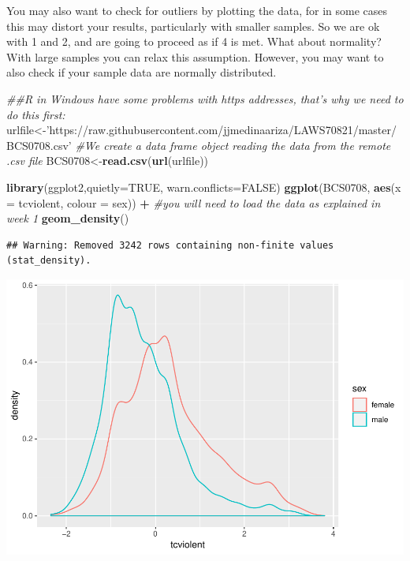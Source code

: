 \documentclass[]{book}
\newenvironment{Shaded}{\begin{snugshade}}{\end{snugshade}}
\newcommand{\CommentTok}[1]{\textcolor[rgb]{0.56,0.35,0.01}{\textit{#1}}}
\newcommand{\DataTypeTok}[1]{\textcolor[rgb]{0.13,0.29,0.53}{#1}}
\newcommand{\KeywordTok}[1]{\textcolor[rgb]{0.13,0.29,0.53}{\textbf{#1}}}
\newcommand{\NormalTok}[1]{#1}
\newcommand{\OperatorTok}[1]{\textcolor[rgb]{0.81,0.36,0.00}{\textbf{#1}}}
\newcommand{\OtherTok}[1]{\textcolor[rgb]{0.56,0.35,0.01}{#1}}
\newcommand{\StringTok}[1]{\textcolor[rgb]{0.31,0.60,0.02}{#1}}
\theoremstyle{definition}
\theoremstyle{definition}
\theoremstyle{definition}
\theoremstyle{remark}
\begin{document}
You may also want to check for outliers by plotting the data, for in
some cases this may distort your results, particularly with smaller
samples. So we are ok with 1 and 2, and are going to proceed as if 4 is
met. What about normality? With large samples you can relax this
assumption. However, you may want to also check if your sample data are
normally distributed.

\begin{Shaded}
\begin{Highlighting}[]
\CommentTok{##R in Windows have some problems with https addresses, that's why we need to do this first:}
\NormalTok{urlfile<-}\StringTok{'https://raw.githubusercontent.com/jjmedinaariza/LAWS70821/master/BCS0708.csv'}
\CommentTok{#We create a data frame object reading the data from the remote .csv file}
\NormalTok{BCS0708<-}\KeywordTok{read.csv}\NormalTok{(}\KeywordTok{url}\NormalTok{(urlfile))}
\end{Highlighting}
\end{Shaded}

\begin{Shaded}
\begin{Highlighting}[]
\KeywordTok{library}\NormalTok{(ggplot2,}\DataTypeTok{quietly=}\OtherTok{TRUE}\NormalTok{, }\DataTypeTok{warn.conflicts=}\OtherTok{FALSE}\NormalTok{)}
\KeywordTok{ggplot}\NormalTok{(BCS0708, }\KeywordTok{aes}\NormalTok{(}\DataTypeTok{x =}\NormalTok{ tcviolent, }\DataTypeTok{colour =}\NormalTok{ sex)) }\OperatorTok{+}\StringTok{ }\CommentTok{#you will need to load the data as explained in week 1}
\StringTok{  }\KeywordTok{geom_density}\NormalTok{() }
\end{Highlighting}
\end{Shaded}

\begin{verbatim}
## Warning: Removed 3242 rows containing non-finite values (stat_density).
\end{verbatim}

\includegraphics{06-hypothesis_testing_files/figure-latex/unnamed-chunk-2-1.pdf}
\end{document}
